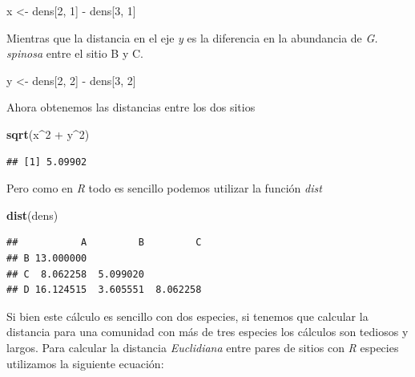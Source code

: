 \documentclass[]{book}
\newenvironment{Shaded}{\begin{snugshade}}{\end{snugshade}}
\newcommand{\KeywordTok}[1]{\textcolor[rgb]{0.13,0.29,0.53}{\textbf{{#1}}}}
\newcommand{\DecValTok}[1]{\textcolor[rgb]{0.00,0.00,0.81}{{#1}}}
\newcommand{\StringTok}[1]{\textcolor[rgb]{0.31,0.60,0.02}{{#1}}}
\newcommand{\NormalTok}[1]{{#1}}
\begin{document}
\begin{Shaded}
\begin{Highlighting}[]
\NormalTok{x <-}\StringTok{ }\NormalTok{dens[}\DecValTok{2}\NormalTok{, }\DecValTok{1}\NormalTok{] -}\StringTok{ }\NormalTok{dens[}\DecValTok{3}\NormalTok{, }\DecValTok{1}\NormalTok{]}
\end{Highlighting}
\end{Shaded}

Mientras que la distancia en el eje \emph{y} es la diferencia en la
abundancia de \emph{G. spinosa} entre el sitio B y C.

\begin{Shaded}
\begin{Highlighting}[]
\NormalTok{y <-}\StringTok{ }\NormalTok{dens[}\DecValTok{2}\NormalTok{, }\DecValTok{2}\NormalTok{] -}\StringTok{ }\NormalTok{dens[}\DecValTok{3}\NormalTok{, }\DecValTok{2}\NormalTok{]}
\end{Highlighting}
\end{Shaded}

Ahora obtenemos las distancias entre los dos sitios

\begin{Shaded}
\begin{Highlighting}[]
\KeywordTok{sqrt}\NormalTok{(x^}\DecValTok{2} \NormalTok{+}\StringTok{ }\NormalTok{y^}\DecValTok{2}\NormalTok{)}
\end{Highlighting}
\end{Shaded}

\begin{verbatim}
## [1] 5.09902
\end{verbatim}

Pero como en \emph{R} todo es sencillo podemos utilizar la función
\emph{dist}

\begin{Shaded}
\begin{Highlighting}[]
\KeywordTok{dist}\NormalTok{(dens)}
\end{Highlighting}
\end{Shaded}

\begin{verbatim}
##           A         B         C
## B 13.000000                    
## C  8.062258  5.099020          
## D 16.124515  3.605551  8.062258
\end{verbatim}

Si bien este cálculo es sencillo con dos especies, si tenemos que
calcular la distancia para una comunidad con más de tres especies los
cálculos son tediosos y largos. Para calcular la distancia
\emph{Euclidiana} entre pares de sitios con \emph{R} especies utilizamos
la siguiente ecuación:
\end{document}

